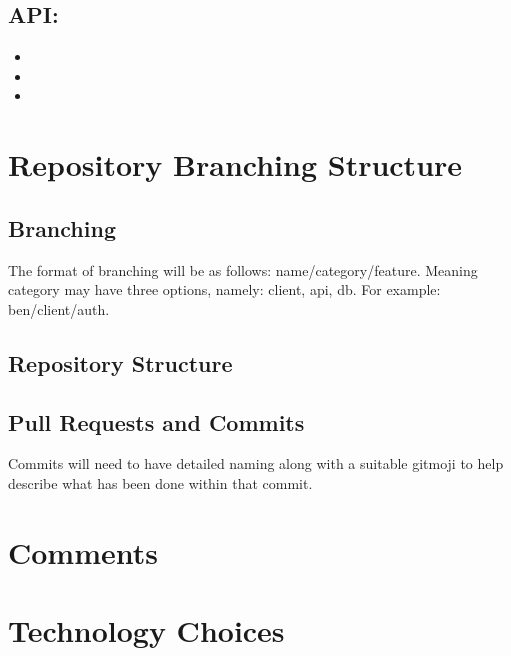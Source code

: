 \documentclass[hidelinks, 12pt, a4paper]{article}
\begin{document}
        \subsection{\large{\textbf{API:}}}
        \begin{itemize}[]
            \item  
            \item  
            \item 
        \end{itemize}
        
\newpage
        
\section{Repository Branching Structure}
\subsection{Branching}
\vspace{0.5cm} 
The format of branching will be as follows: name/category/feature.
Meaning category may have three options, namely: client, api, db.
For example: ben/client/auth.
\subsection{Repository Structure}
\vspace{0.5cm} 

\subsection{Pull Requests and Commits}
\vspace{0.5cm} 
Commits will need to have detailed naming along with a suitable gitmoji to help describe what has been done within that commit.
\newpage  

\section{Comments}
\newpage

\section{Technology Choices}
\end{document}
